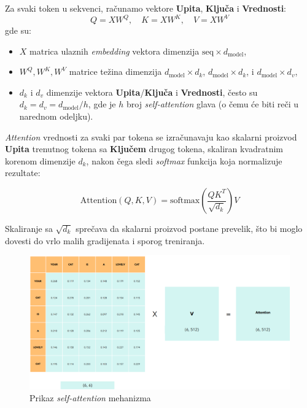 \documentclass[12pt]{article}
\begin{document}
  Za svaki token u sekvenci, računamo vektore \textbf{Upita}, \textbf{Ključa} i \textbf{Vrednosti}:
   \vspace{-0.2cm} %
  \[
  Q = XW^Q, \quad K = XW^K, \quad V = XW^V
  \]
  \vspace{-0.7cm} %
  gde su:
  \begin{itemize}
   \vspace{0.2cm} %
      \item \( X \) matrica ulaznih \textit{embedding} vektora 
      dimenzija \( \text{seq} \times d_{\text{model}} \),
      \item \( W^Q, W^K, W^V \) matrice težina dimenzija 
      \( d_{\text{model}} \times d_k \), \( d_{\text{model}} \times d_k \), 
      i \( d_{\text{model}} \times d_v \),
      \item \( d_k \) i \( d_v \) dimenzije vektora \textbf{Upita}/\textbf{Ključa} i \textbf{Vrednosti}, 
      često su \\ \( d_k = d_v = d_{\text{model}}/h \), gde je \( h \) 
      broj \textit{self-attention} glava (o čemu će biti reči u narednom odeljku).
  \end{itemize}
  
  \textit{Attention} vrednosti za svaki par tokena se izračunavaju kao skalarni proizvod 
  \textbf{Upita} trenutnog tokena sa \textbf{Ključem} drugog tokena, 
  skaliran kvadratnim korenom dimenzije \( d_k \), nakon čega sledi \textit{softmax} 
  funkcija koja normalizuje rezultate:
  
  \vspace{-0.7cm} %
  \[
  \text{Attention}(Q, K, V) = \text{softmax}\left(\frac{QK^T}{\sqrt{d_k}}\right)V
  \]
  \vspace{-0.7cm} %

  Skaliranje sa \( \sqrt{d_k} \) sprečava da skalarni proizvod postane prevelik, 
  što bi moglo dovesti do vrlo malih gradijenata i sporog treniranja.

   \begin{figure}[h!]
   \centering
   \includegraphics[width=1.1\textwidth]{self_attention.png}
   \caption{Prikaz \textit{self-attention} mehanizma \cite{transformer}}
   \label{fig:self_attention}
   \end{figure}
\end{document}
